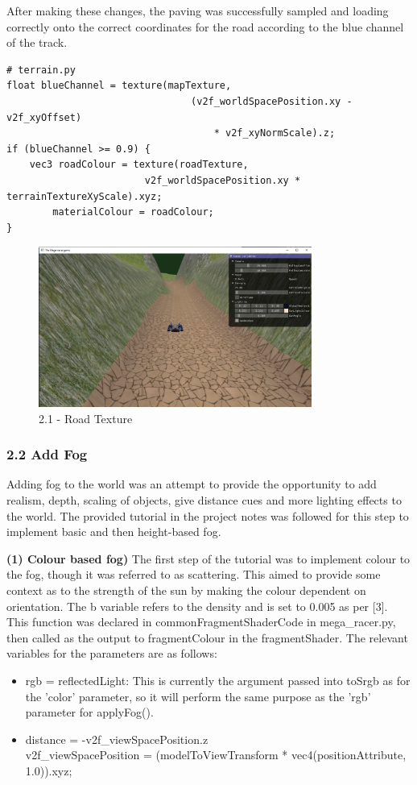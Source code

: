\documentclass[a4 paper, 12pt]{article}
\begin{document}
After making these changes, the paving was successfully sampled and loading correctly onto the correct coordinates for the road according to the blue channel of the track.
    \begin{lstlisting}
# terrain.py       
float blueChannel = texture(mapTexture, 
                                (v2f_worldSpacePosition.xy - v2f_xyOffset) 
                                    * v2f_xyNormScale).z;
if (blueChannel >= 0.9) {
    vec3 roadColour = texture(roadTexture, 
                        v2f_worldSpacePosition.xy * terrainTextureXyScale).xyz;
        materialColour = roadColour;
}
    \end{lstlisting} 

    \begin{figure} [H]
        \centering
        \includegraphics[width=0.8\textwidth, frame]
            {./images/mega_racer/2.1_c_final.PNG}
        \caption{2.1 - Road Texture}   
    \end{figure}


\subsubsection{2.2 Add Fog}
Adding fog to the world was an attempt to provide the opportunity to add realism, depth, scaling of objects, give distance cues and more lighting effects to the world. The provided tutorial in the project notes was followed for this step to implement basic and then height-based fog.

\textbf{(1) Colour based fog)}
The first step of the tutorial was to implement colour to the fog, though it was referred to as scattering. This aimed to provide some context as to the strength of the sun by making the colour dependent on orientation. The b variable refers to the density and is set to 0.005 as per [3]. This function was declared in commonFragmentShaderCode in mega\_racer.py, then called as the output to fragmentColour in the fragmentShader. The relevant variables for the parameters are as follows:
    \begin{itemize}
        \item rgb = reflectedLight: This is currently the argument passed into toSrgb as for the 'color' parameter, so it will perform the same purpose as the 'rgb' parameter for applyFog().
        \item distance = -v2f\_viewSpacePosition.z \\      
        v2f\_viewSpacePosition = (modelToViewTransform * vec4(positionAttribute, 1.0)).xyz;
    \end{itemize}
\end{document}
